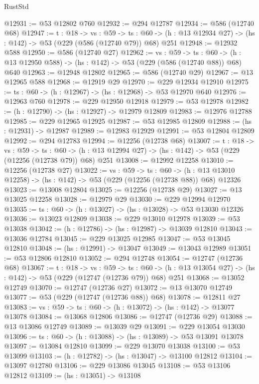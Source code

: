 \begin{lexlean}{RustStd}
\begin{coremodule}
@12931 := @53 @12802 @760
@12932 := @294 @12787
@12934 := @586 (@12740 @68)
@12947 := {t : @18} ->
  {vs : @59} ->
  {ts : @60} -> (h : @13 @12934 @27) -> (hs : @142) -> @53 (@229 (@586 (@12740 @79)) @68) @251
@12948 := @12932 @588
@12950 := @586 (@12740 @27)
@12962 := {vs : @59} ->
  {ts : @60} -> (h : @13 @12950 @588) -> (hs : @142) -> @53 (@229 (@586 (@12740 @88)) @68) @640
@12963 := @12948 @12802
@12965 := @586 (@12740 @29)
@12967 := @13 @12965 @588
@12968 := @12919 @29
@12970 := @229 @12934 @12910
@12975 := {ts : @60} -> (h : @12967) -> (hs : @12968) -> @53 @12970 @640
@12976 := @12963 @760
@12978 := @229 @12950 @12918
@12979 := @53 @12978
@12982 := (h : @12790) -> (hs : @12927) -> @12979 @12809
@12983 := @12976 @12788
@12985 := @229 @12965 @12925
@12987 := @53 @12985 @12809
@12988 := (hs : @12931) -> @12987
@12989 := @12983 @12929
@12991 := @53 @12804 @12809
@12992 := @294 @12783
@12994 := @12256 (@12738 @68)
@13007 := {t : @18} ->
  {vs : @59} ->
  {ts : @60} -> (h : @13 @12994 @27) -> (hs : @142) -> @53 (@229 (@12256 (@12738 @79)) @68) @251
@13008 := @12992 @12258
@13010 := @12256 (@12738 @27)
@13022 := {vs : @59} ->
  {ts : @60} ->
  (h : @13 @13010 @12258) -> (hs : @142) -> @53 (@229 (@12256 (@12738 @88)) @68) @12326
@13023 := @13008 @12804
@13025 := @12256 (@12738 @29)
@13027 := @13 @13025 @12258
@13028 := @12979 @29
@13030 := @229 @12994 @12970
@13035 := {ts : @60} -> (h : @13027) -> (hs : @13028) -> @53 @13030 @12326
@13036 := @13023 @12809
@13038 := @229 @13010 @12978
@13039 := @53 @13038
@13042 := (h : @12786) -> (hs : @12987) -> @13039 @12810
@13043 := @13036 @12784
@13045 := @229 @13025 @12985
@13047 := @53 @13045 @12810
@13048 := (hs : @12991) -> @13047
@13049 := @13043 @12989
@13051 := @53 @12806 @12810
@13052 := @294 @12748
@13054 := @12747 (@12736 @68)
@13067 := {t : @18} ->
  {vs : @59} ->
  {ts : @60} -> (h : @13 @13054 @27) -> (hs : @142) -> @53 (@229 (@12747 (@12736 @79)) @68) @251
@13068 := @13052 @12749
@13070 := @12747 (@12736 @27)
@13072 := @13 @13070 @12749
@13077 := @53 (@229 (@12747 (@12736 @88)) @68)
@13078 := @12811 @27
@13083 := {vs : @59} -> {ts : @60} -> (h : @13072) -> (hs : @142) -> @13077 @13078
@13084 := @13068 @12806
@13086 := @12747 (@12736 @29)
@13088 := @13 @13086 @12749
@13089 := @13039 @29
@13091 := @229 @13054 @13030
@13096 := {ts : @60} -> (h : @13088) -> (hs : @13089) -> @53 @13091 @13078
@13097 := @13084 @12810
@13099 := @229 @13070 @13038
@13100 := @53 @13099
@13103 := (h : @12782) -> (hs : @13047) -> @13100 @12812
@13104 := @13097 @12780
@13106 := @229 @13086 @13045
@13108 := @53 @13106 @12812
@13109 := (hs : @13051) -> @13108

\end{coremodule}
\end{lexlean}
